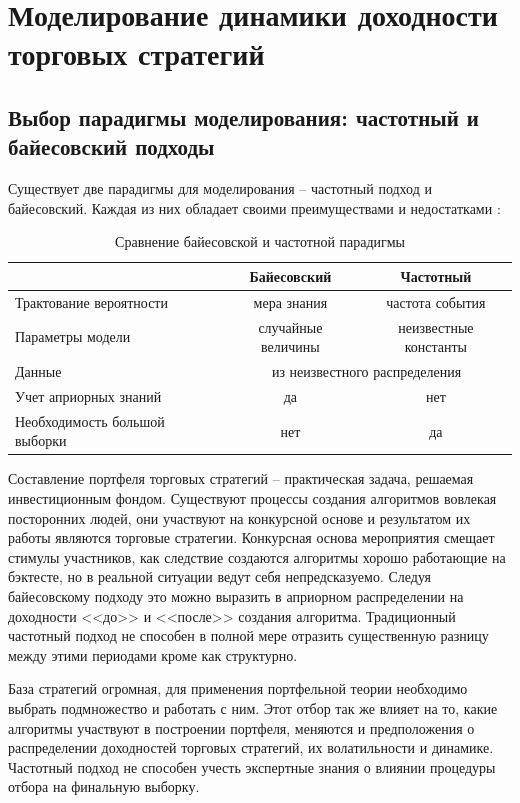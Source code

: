 \chapter{Моделирование динамики доходности торговых стратегий}
\section{Выбор парадигмы моделирования: частотный и байесовский подходы}
Существует две парадигмы для моделирования -- частотный подход и байесовский. Каждая из них обладает своими преимуществами и недостатками \citep{gelman2008}:
\begin{table}[h]
\centering
\caption{Сравнение байесовской и частотной парадигмы}
	\begin{tabular}{l|c|c}
	& Байесовский  & Частотный \\ \hline
	Трактование вероятности & мера знания & частота события \\ \hline
	Параметры модели & случайные величины & неизвестные константы \\ \hline
	Данные & \multicolumn{2}{c}{из неизвестного распределения}  \\ \hline
	Учет априорных знаний & да & нет \\ \hline
	Необходимость большой выборки & нет & да
 	\end{tabular}
\end{table}

Составление портфеля торговых стратегий -- практическая задача, решаемая инвестиционным фондом. Существуют процессы создания алгоритмов вовлекая посторонних людей, они участвуют на конкурсной основе и результатом их работы являются торговые стратегии. Конкурсная основа мероприятия смещает стимулы участников, как следствие создаются алгоритмы хорошо работающие на бэктесте, но в реальной ситуации ведут себя непредсказуемо. Следуя байесовскому подходу это можно выразить в априорном распределении на доходности <<до>> и <<после>> создания алгоритма. Традиционный частотный подход не способен в полной мере отразить существенную разницу между этими периодами кроме как структурно.

База стратегий огромная, для применения портфельной теории необходимо выбрать подмножество и работать с ним. Этот отбор так же влияет на то, какие алгоритмы участвуют в построении портфеля, меняются и предположения о распределении доходностей торговых стратегий, их волатильности и динамике. Частотный подход не способен учесть экспертные знания о влиянии процедуры отбора на финальную выборку.

